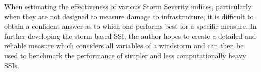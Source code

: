     When estimating the effectiveness of various Storm Severity indices, particularly when they are not designed to measure damage to infrastructure, it is difficult to obtain a confident answer as to which one performs best for a specific measure. In further developing the storm-based SSI, the author hopes to create a detailed and reliable measure which considers all variables of a windstorm and can then be used to benchmark the performance of simpler and less computationally heavy SSIs.